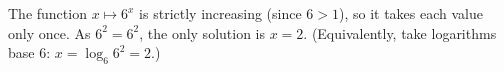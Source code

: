 The function $x\mapsto6^x$ is strictly increasing (since $6>1$), so it takes each value only once. As $6^2=6^2$, the only solution is $\boxed{x=2}$. (Equivalently, take logarithms base $6$: $x=\log_6 6^2=2$.)
